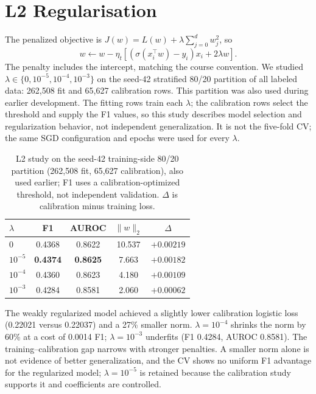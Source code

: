 \documentclass[10pt,conference,compsocconf]{IEEEtran}
\begin{document}
\section{L2 Regularisation}
The penalized objective is $J(w)=L(w)+\lambda\sum_{j=0}^{d}w_j^2$, so
\begin{equation}
w\leftarrow w-\eta_t\left[
\left(\sigma(x_i^{\top}w)-y_i\right)x_i+2\lambda w\right].
\end{equation}
The penalty includes the intercept, matching the course convention. We studied
$\lambda\in\{0,10^{-5},10^{-4},10^{-3}\}$ on the seed-42 stratified 80/20
partition of all labeled data: 262{,}508 fit and 65{,}627 calibration rows.
This partition was also used during earlier development. The fitting rows train
each $\lambda$; the calibration rows select the threshold and supply the F1
values, so this study describes model selection and regularization behavior,
not independent generalization. It is not the five-fold CV; the same SGD
configuration and epochs were used for every $\lambda$.

\begin{table}[t]
\centering
\small
\caption{L2 study on the seed-42 training-side 80/20 partition (262{,}508 fit,
65{,}627 calibration), also used earlier; F1 uses a calibration-optimized
threshold, not independent validation. $\Delta$ is calibration minus training loss.}
\label{tab:reg}
\setlength{\tabcolsep}{3pt}
\begin{tabular}{lcccc}
\hline
$\lambda$ & F1 & AUROC & $\|w\|_2$ & $\Delta$\\
\hline
0 & 0.4368 & 0.8622 & 10.537 & $+0.00219$\\
$10^{-5}$ & \textbf{0.4374} & \textbf{0.8625} & 7.663 & $+0.00182$\\
$10^{-4}$ & 0.4360 & 0.8623 & 4.180 & $+0.00109$\\
$10^{-3}$ & 0.4284 & 0.8581 & 2.060 & $+0.00062$\\
\hline
\end{tabular}
\end{table}

The weakly regularized model achieved a slightly lower calibration logistic
loss (0.22021 versus 0.22037) and a 27\% smaller norm. $\lambda=10^{-4}$ shrinks
the norm by 60\% at a cost of 0.0014 F1; $\lambda=10^{-3}$ underfits (F1 0.4284,
AUROC 0.8581). The training--calibration gap narrows with stronger penalties.
A smaller norm alone is not evidence of better generalization, and the CV shows
no uniform F1 advantage for the regularized model; $\lambda=10^{-5}$ is retained
because the calibration study supports it and coefficients are controlled.
\end{document}
